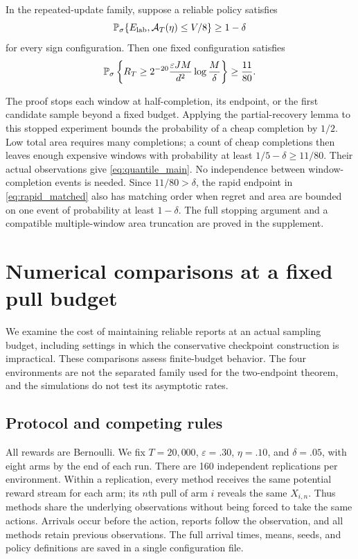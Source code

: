 \documentclass[11pt]{article}
\begin{document}
\begin{theorem}
\label{thm:quantile_main}
In the repeated-update family, suppose a reliable policy satisfies
\[
 \mathbb P_\sigma\{E_{\rm lab},\mathcal A_T(\eta)\le V/8\}\ge1-\delta
\]
for every sign configuration. Then one fixed configuration satisfies
\begin{equation}
 \mathbb P_\sigma\left\{R_T\ge
 2^{-20}\frac{\varepsilon JM}{d^2}\log\frac M\delta\right\}
 \ge\frac{11}{80}.
 \label{eq:quantile_main}
\end{equation}
\end{theorem}

The proof stops each window at half-completion, its endpoint, or the first
candidate sample beyond a fixed budget. Applying the partial-recovery lemma
to this stopped experiment bounds the probability of a cheap completion by
$1/2$. Low total area requires many completions; a count of cheap completions
then leaves enough expensive windows with probability at least
$1/5-\delta\ge11/80$. Their actual observations give
\eqref{eq:quantile_main}. No independence between window-completion events is
needed. Since $11/80>\delta$, the rapid endpoint in
\eqref{eq:rapid_matched} also has matching order when regret and area are
bounded on one event of probability at least $1-\delta$. The full stopping
argument and a compatible multiple-window area truncation are proved in the
supplement.
\section{Numerical comparisons at a fixed pull budget}
\label{sec:experiments}

We examine the cost of maintaining reliable reports at an actual sampling
budget, including settings in which the conservative checkpoint construction
is impractical. These comparisons assess finite-budget behavior. The four
environments are not the separated family used for the two-endpoint theorem,
and the simulations do not test its asymptotic rates.

\subsection{Protocol and competing rules}

All rewards are Bernoulli. We fix $T=20{,}000$, $\varepsilon=.30$,
$\eta=.10$, and $\delta=.05$, with eight arms by the end of each run.
There are 160 independent replications per environment. Within a replication,
every method receives the same potential reward stream for each arm; its
$n$th pull of arm $i$ reveals the same $X_{i,n}$. Thus methods share the
underlying observations without being forced to take the same actions.
Arrivals occur before the action, reports follow the observation, and all
methods retain previous observations. The full arrival times, means, seeds,
and policy definitions are saved in a single configuration file.
\end{document}
